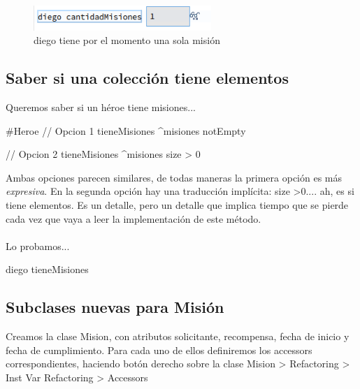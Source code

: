 \documentclass[a4paper,12pt]{book}
\begin{document}
\begin{figure}[h!]
    \centering	
    \includegraphics[width=0.6\textwidth]{images/15_diego_cantidadMisiones.png}
    \caption{diego tiene por el momento una sola misión}
\end{figure}
\FloatBarrier

\subsection{Saber si una colección tiene elementos}
Queremos saber si un héroe tiene misiones...

\begin{code}
#Heroe
// Opcion 1
tieneMisiones
    ^misiones notEmpty
\end{code}

    
\begin{code}

// Opcion 2
tieneMisiones
    ^misiones size > 0
\end{code}

Ambas opciones parecen similares, de todas maneras la primera opción es más \textit{expresiva}. En la segunda
opción hay una traducción implícita: size \textgreater  0.... ah, es si tiene elementos. Es un detalle, 
pero un detalle que implica tiempo que se pierde cada vez que vaya a leer la implementación de este método.
\\
\\
Lo probamos...

\begin{code}
diego tieneMisiones
\end{code}

\subsection{Subclases nuevas para Misión}
Creamos la clase Mision, con atributos solicitante, recompensa, fecha de inicio y fecha de cumplimiento. 
Para cada uno de ellos definiremos los accessors correspondientes, haciendo botón derecho sobre la clase
Mision > Refactoring > Inst Var Refactoring > Accessors 
\end{document}
